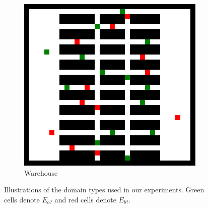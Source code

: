 \documentclass[letterpaper]{article} %
\def\
UrlFont{\rm}  %
\newcommand{\eao}{E_{o?}} %
\newcommand{\eab}{E_{b?}} %
\theoremstyle{definition}
\begin{document}
\begin{figure}[t]
\begin{subfigure}[b]{0.32\columnwidth}
      \includegraphics[scale=.3]{Figures/warehouse-32-32.map.png}
      \caption{Warehouse}
    \end{subfigure}
    \caption{Illustrations of the domain types used in our experiments. Green cells denote $\eao$ and red cells denote $\eab$.}
    \label{fig:grids}
\end{figure}
\end{document}
